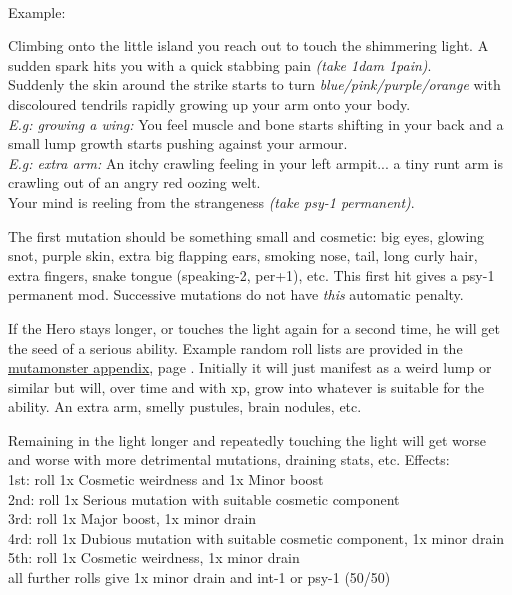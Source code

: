 \

\noindent Example:
\begin{readoutloud}
Climbing onto the little island you reach out to touch the shimmering light. A sudden spark hits you with a quick stabbing pain \emph{(take 1dam 1pain)}.\\
Suddenly the skin around the strike starts to turn \emph{blue/pink/purple/orange} with discoloured tendrils rapidly growing up your arm onto your body.\\
\emph{E.g: growing a wing:} You feel muscle and bone starts shifting in your back and a small lump growth starts pushing against your armour.\\
\emph{E.g: extra arm:} An itchy crawling feeling in your left armpit... a tiny runt arm is crawling out of an angry red oozing welt.\\
Your mind is reeling from the strangeness \emph{(take psy-1 permanent)}.
\end{readoutloud}

\noindent The first mutation should be something small and cosmetic: big eyes, glowing snot, purple skin, extra big flapping ears, smoking nose, tail, long curly hair, extra fingers, snake tongue (speaking-2, per+1), etc. This first hit gives a psy-1 permanent mod. Successive mutations do not have \emph{this} automatic penalty.

If the Hero stays longer, or touches the light again for a second time, he will get the seed of a serious ability. Example random roll lists are provided in the \hyperref[appendixmagicisland]{mutamonster appendix}, page \pageref{appendixmagicisland}. Initially it will just manifest as a weird lump or similar but will, over time and with xp, grow into whatever is suitable for the ability. An extra arm, smelly pustules, brain nodules, etc.

Remaining in the light longer and repeatedly touching the light will get worse and worse with more detrimental mutations, draining stats, etc. Effects:\\
1st: roll 1x Cosmetic weirdness and 1x Minor boost\\
2nd: roll 1x Serious mutation with suitable cosmetic component\\
3rd: roll 1x Major boost, 1x minor drain\\
4rd: roll 1x Dubious mutation with suitable cosmetic component, 1x minor drain\\
5th: roll 1x Cosmetic weirdness, 1x minor drain\\
all further rolls give 1x minor drain and int-1 or psy-1 (50/50)

